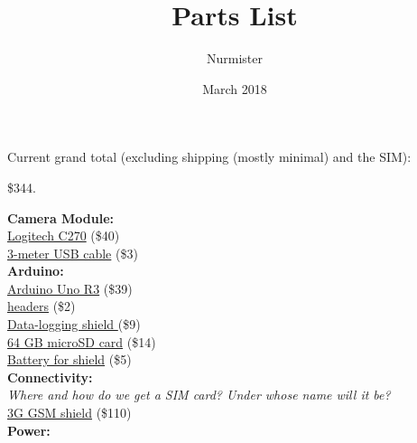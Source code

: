 \documentclass{article}
\title{Parts List}
\author{Nurmister}
\date{March 2018}
\begin{document}
\maketitle

Current grand total (excluding shipping (mostly minimal) and the SIM): 
\begin{center} \$344.
\\ \end{center}

\hspace*{-5mm}\textbf{Camera Module:}
\\
\hspace*{10mm}\href{https://www.qoo10.sg/gmkt.inc/goods/goods.aspx?goodscode=419765716\&jaehuid=2026058764}{Logitech
 C270} (\$40)
\\
\hspace*{10mm}\href{https://goo.gl/GuZxJm}{3-meter USB cable} (\$3)
\\
\textbf{Arduino:}
\\
\hspace*{10mm}\href{https://www.sgbotic.com/index.php?dispatch=products.view&product_id=1842}{Arduino
 Uno R3} (\$39)
\\
\hspace*{10mm}\href{https://www.sgbotic.com/index.php?dispatch=products.view&product_id=1176
}{headers} (\$2) \\
\hspace*{10mm}\href{https://goo.gl/yQebem}{Data-logging shield } (\$9)
\\
\hspace*{20mm}\href{https://www.lazada.sg/products/64gb128gb256gb512gb-class-10-micro-memory-sd-card-with-adaptor-red-intl-i142237635-s174867244.html}{64
 GB microSD card} (\$14) \\
\hspace*{20mm}\href{https://www.lazada.sg/products/sony-lithium-cell-cr1220-3v-button-battery-2-pieces-i149268393-s184886719.html?spm=a2o42.searchlist.list.10.15b56b8eUZ6PbG&search=1}{Battery
 for shield} (\$5)
\\
\textbf{Connectivity:}
\\
\hspace*{10mm}\textit{Where and how do we get a SIM card? Under whose name will it be?}
\\
\hspace*{10mm}\href{https://www.sgbotic.com/index.php?dispatch=products.view&product_id=2294}{3G 
GSM shield} (\$110)
\\
\textbf{Power:}
\\
\end{document}
